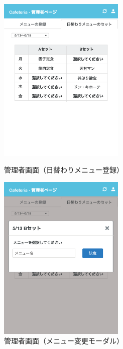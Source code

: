 \documentclass[a4paper]{ltjsarticle}
\begin{document}
        \begin{figure}[ht]
            \begin{minipage}[t]{.49\textwidth}
                \center
                \includegraphics[width=60mm]{ui/admin-home-set-menu.png}
                \caption{管理者画面（日替わりメニュー登録）}
                \label{img:admin-home-set-menu}
            \end{minipage}
            \begin{minipage}[t]{.49\textwidth}
                \center
                \includegraphics[width=60mm]{ui/admin-home-set-menu-modal.png}
                \caption{管理者画面（メニュー変更モーダル）}
                \label{img:admin-home-set-menu-modal}
            \end{minipage}
        \end{figure}
\end{document}
